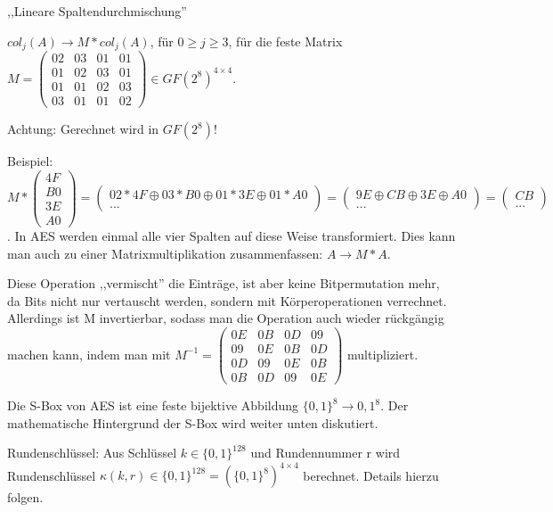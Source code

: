 \documentclass[a4paper]{article}
\begin{document}
\begin{multicols}{3}
\begin{itemize*}
        \item  ,,Lineare Spaltendurchmischung''
        \item $col_j(A) \rightarrow M*col_j(A)$, für $0\geq j\geq 3$, für die feste Matrix $M=\begin{pmatrix} 02& 03& 01& 01\\ 01& 02& 03& 01\\ 01& 01& 02& 03\\ 03& 01& 01& 02\end{pmatrix}\in GF(2^8)^{4\times 4}$.
    \end{itemize*}

    Achtung: Gerechnet wird in $GF(2^8)$!

    Beispiel: $M*\begin{pmatrix} 4F\\ B0\\ 3E\\ A0\end{pmatrix} = \begin{pmatrix} 02*4F\oplus 03*B0\oplus 01*3E\oplus 01*A0\\ ... \end{pmatrix} = \begin{pmatrix} 9E\oplus CB\oplus 3E\oplus A0 \\ ... \end{pmatrix} = \begin{pmatrix} CB\\...\end{pmatrix}$.
    In AES werden einmal alle vier Spalten auf diese Weise transformiert. Dies kann man auch zu einer Matrixmultiplikation zusammenfassen: $A \rightarrow M*A$.

    Diese Operation ,,vermischt'' die Einträge, ist aber keine Bitpermutation mehr, da Bits nicht nur vertauscht werden, sondern mit Körperoperationen verrechnet. Allerdings ist M invertierbar, sodass man die Operation auch wieder rückgängig machen kann, indem man mit $M^{-1}=\begin{pmatrix} 0E& 0B& 0D& 09\\ 09& 0E& 0B& 0D\\ 0D& 09& 0E& 0B\\ 0B& 0D& 09& 0E\end{pmatrix}$ multipliziert.
    \begin{itemize*}
        \item Die S-Box von AES ist eine feste bijektive Abbildung $\{0,1\}^8\rightarrow {0,1}^8$. Der mathematische Hintergrund der S-Box wird weiter unten diskutiert.
        \item Rundenschlüssel: Aus Schlüssel $k\in\{0,1\}^{128}$ und Rundennummer r wird Rundenschlüssel $\kappa (k,r)\in\{0,1\}^{128}=(\{0,1\}^8)^{4\times 4}$ berechnet. Details hierzu folgen.
    \end{itemize*}


\end{multicols}
\end{document}
